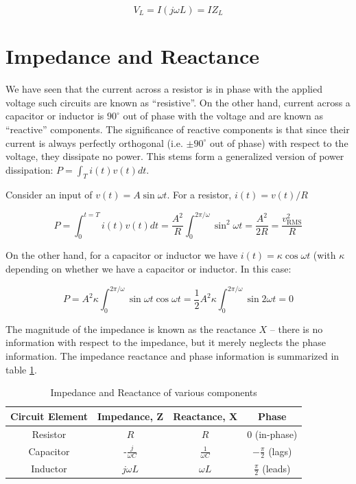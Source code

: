 \documentclass{tufte-book}
\begin{document}
\begin{equation}\label{eq:impedance_inductor}
V_L = I\left(j\omega L\right) = IZ_L
\end{equation}

\section{Impedance and Reactance}
We have seen that the current across a resistor is in phase with the applied voltage such circuits are known as ``resistive''. On the other hand, current across a capacitor or inductor is $90^\circ$ out of phase with the voltage and are known as ``reactive'' components. The significance of reactive components is that since their current is always perfectly orthogonal (i.e. $\pm90^\circ$ out of phase) with respect to the voltage, they dissipate no power. This stems form a generalized version of power dissipation: $P = \int_T i(t)v(t)dt$. 

Consider an input of $v(t) = A\sin\omega t$. For a resistor, $i(t) = v(t)/R$

$$
P = \int_0^{t=T} i(t)v(t)dt = \frac{A^2}{R}\int_0^{2\pi/\omega} \sin^2\omega t = \frac{A^2}{2R} = \frac{v^2_\text{RMS}}{R}
$$

\noindent On the other hand, for a capacitor or inductor we have $i(t) = \kappa\cos\omega t$ (with $\kappa$ depending on whether we have a capacitor or inductor. In this case:

$$
P = A^2\kappa\int_0^{2\pi/\omega} \sin\omega t\cos\omega t = \frac{1}{2}A^2\kappa\int_0^{2\pi/\omega}\sin2\omega t = 0
$$

The magnitude of the impedance is known as the reactance $X$ -- there is no information with respect to the impedance, but it merely neglects the phase information. The impedance reactance and phase information is summarized in table \ref{tab:impedance}.

\begin{table}[h]
\caption{Impedance and Reactance of various components}
\centering
\label{tab:impedance}
\begin{tabular}{|c|c|c|c|} \hline
Circuit Element & Impedance, Z & Reactance, X & Phase  \\ \hline \hline
Resistor & $R$ & $R$ & $0$ (in-phase) \\ \hline
Capacitor & -$\frac{j}{\omega C}$ & $\frac{1}{\omega C}$ & $-\frac{\pi}{2}$ (lags) \\ \hline
Inductor & $j \omega L$ & $\omega L$ & $\frac{\pi}{2}$ (leads) \\ \hline
\end{tabular}
\end{table}
\end{document}
